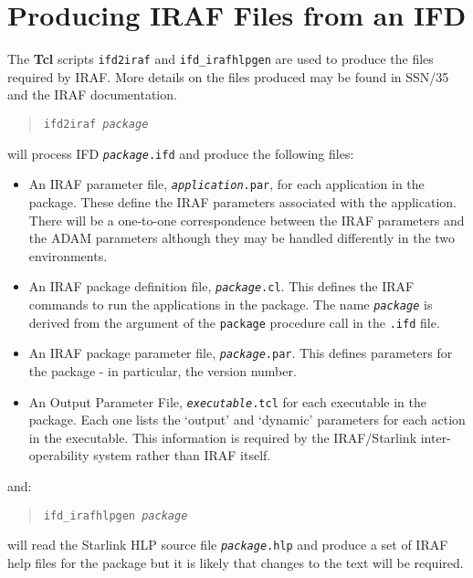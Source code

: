 \documentclass[twoside,11pt]{article}
\newcommand{\htmlref}[2]{#1}
\newcommand{\xref}[3]{#1}
\newcommand{\xlabel}[1]{}
\begin{document}
\section{\label{ifd2iraf}\xlabel{producing_iraf_files_from_an_ifd}Producing
IRAF Files from an IFD}
The \textbf{Tcl} scripts \texttt{ifd2iraf} and \texttt{ifd\_irafhlpgen} are
used to produce the files required by IRAF.
More details on the files produced may be found in
\xref{SSN/35}{ssn35}{}
and the IRAF documentation.
\begin{quote}
\texttt{ifd2iraf \textit{package}}
\end{quote}
will process IFD \texttt{\textit{package}.ifd} and produce the following files:
\begin{itemize}
\item An
\xref{IRAF parameter file}{ssn35}{task_parameter_files},
\texttt{\textit{application}.par}, for each application in the package.
These define the IRAF parameters associated with the application.
There will be a one-to-one correspondence between the IRAF parameters and the
ADAM parameters although they may be handled differently in the two
environments.
\item An
\xref{IRAF package definition file}{ssn35}{package_definition_files},
\texttt{\textit{package}.cl}. This defines the IRAF commands to run
the applications in the package.
The name \texttt{\textit{package}} is derived from the argument of the
\htmlref{\texttt{package}}{package}
procedure call in the \texttt{.ifd} file.
\item An
\xref{IRAF package parameter file}{ssn35}{package_parameter_files},
\texttt{\textit{package}.par}.
This defines parameters for the package - in particular, the version number.
\item An
\xref{Output Parameter File}{ssn35}{the_output_parameters_file},
\texttt{\textit{executable}.tcl} for each executable in the package.
Each one lists the
\xref{`output'}{ssn35}{output_parameters}
and
\xref{`dynamic'}{ssn35}{dynamic_parameters}
parameters for each action in the executable.
This information is required by the IRAF/Starlink inter-operability system
rather than IRAF itself.
\end{itemize}
and:
\begin{quote}
\texttt{ifd\_irafhlpgen \textit{package}}
\end{quote}
will read the Starlink HLP source file \texttt{\textit{package}.hlp} and
produce a set of
\xref{IRAF help files}{ssn35}{help_files}
for the package but it is likely that changes to the text will be required.
\end{document}
